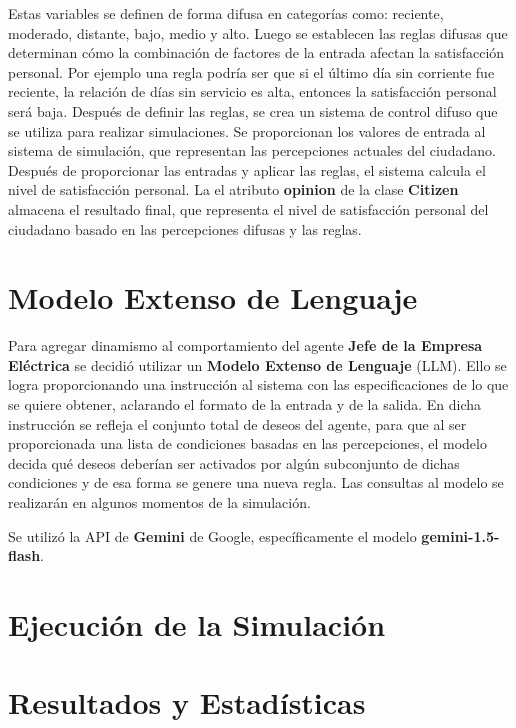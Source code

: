 \documentclass[twocolumn, fontsize=10pt]{article}
\begin{document}
Estas variables se definen de forma difusa en categorías como: reciente, moderado, 
distante, bajo, medio y alto. Luego se 
establecen las reglas difusas que determinan cómo la combinación 
de factores de la entrada afectan la satisfacción personal. 
Por ejemplo una regla podría ser que si el último día sin corriente fue reciente, 
la relación de días sin servicio es alta, entonces la satisfacción personal será baja. 
Después de 
definir las reglas, se crea un sistema de control difuso que se 
utiliza para realizar simulaciones. Se proporcionan los valores 
de entrada al sistema de simulación, que representan las 
percepciones actuales del ciudadano. Después de proporcionar 
las entradas y aplicar las reglas, el sistema calcula el nivel 
de satisfacción personal. La el atributo \textbf{opinion} de la clase \textbf{Citizen} 
almacena el resultado final, que representa el nivel de satisfacción 
personal del ciudadano basado en las percepciones difusas y 
las reglas.

\section{Modelo Extenso de Lenguaje}

Para agregar dinamismo al comportamiento del agente \textbf{Jefe de la Empresa Eléctrica}
se decidió utilizar un \textbf{Modelo Extenso de Lenguaje} (LLM). Ello se logra proporcionando 
una instrucción al sistema con las especificaciones de lo que se quiere obtener, aclarando 
el formato de la entrada y de la salida. En dicha instrucción se refleja el conjunto total de deseos
del agente, para que al ser proporcionada una lista de condiciones basadas en las percepciones, el modelo decida 
qué deseos deberían ser activados por algún subconjunto de dichas condiciones y de esa forma se genere una nueva regla.
Las consultas al modelo se realizarán en algunos momentos de la simulación.

Se utilizó la API de \textbf{Gemini} de Google, específicamente el modelo \textbf{gemini-1.5-flash}.

\section{Ejecución de la Simulación}

\section{Resultados y Estadísticas}
\end{document}
